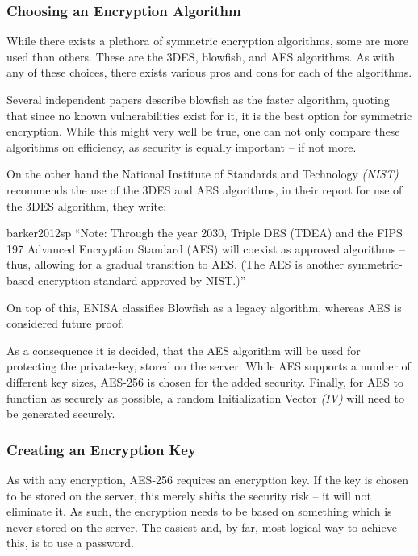 			\subsubsection{Choosing an Encryption Algorithm}
				While there exists a plethora of symmetric encryption algorithms, some are more used than others. These are the 3DES, blowfish, and AES algorithms. As with any of these choices, there exists various pros and cons for each of the algorithms. 

				Several independent papers describe blowfish as the faster algorithm, quoting that since no known vulnerabilities exist for it, it is the best option for symmetric encryption\cite{thakur2011aes,singh2011comparison,verma2011peformance,ramesh2013performance}. While this might very well be true, one can not only compare these algorithms on efficiency, as security is equally important -- if not more. 

				On the other hand the National Institute of Standards and Technology \emph{(NIST)} recommends the use of the 3DES and AES algorithms\cite{barker2012sp}, in their report for use of the 3DES algorithm, they write:
				\begin{citequote}{barker2012sp}
					``Note: Through the year 2030, Triple DES (TDEA) and the FIPS 197 Advanced Encryption Standard (AES) will coexist as approved algorithms – thus, allowing for a gradual transition to AES. (The AES is another symmetric-based encryption standard approved by NIST.)''
				\end{citequote}

				On top of this, ENISA classifies Blowfish as a legacy algorithm, whereas AES is considered future proof\cite[p.20]{enisa}.

				As a consequence it is decided, that the AES algorithm will be used for protecting the private-key, stored on the server. While AES supports a number of different key sizes, AES-256 is chosen for the added security. Finally, for AES to function as securely as possible, a random Initialization Vector \emph{(IV)} will need to be generated securely.

			\subsubsection{Creating an Encryption Key}
				\label{sec:kdf}
				As with any encryption, AES-256 requires an encryption key. If the key is chosen to be stored on the server, this merely shifts the security risk -- it will not eliminate it. As such, the encryption needs to be based on something which is never stored on the server. The easiest and, by far, most logical way to achieve this, is to use a password. 

